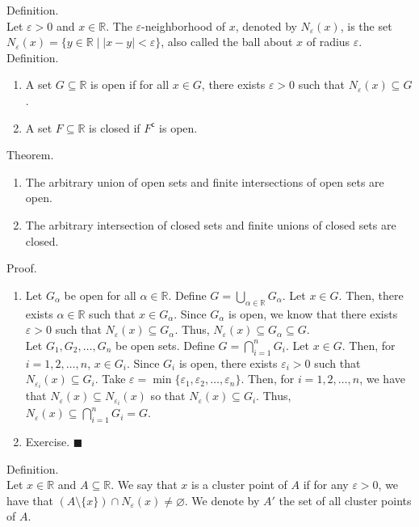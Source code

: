 \documentclass[twocolumn]{article}
\newcommand{\qed}{$\blacksquare$}
\newcommand{\br}{\vspace{\baselineskip}}
\newcommand{\COMPLEMENT}{^\mathsf{c}}
\let\complement\COMPLEMENT
\let\emptyset\varnothing
\let\eps\varepsilon
\newcommand{\reals}{\mathbb{R}}
\begin{document}
Definition. \\
Let $\eps > 0$ and $x \in \reals$. The $\eps$-neighborhood of $x$, denoted by $N_\eps(x)$, is the set $N_\eps(x) = \{ y \in \reals \mid |x - y| < \eps \}$, also called the ball about $x$ of radius $\eps$. \\

Definition.
\begin{enumerate}
	\item
		A set $G \subseteq \reals$ is open if for all $x \in G$, there exists $\eps > 0$ such that $N_\eps(x) \subseteq G$.
	\item
		A set $F \subseteq \reals$ is closed if $F\complement$ is open.
\end{enumerate} \br

Theorem.
\begin{enumerate}
	\item
		The arbitrary union of open sets and finite intersections of open sets are open.
	\item
		The arbitrary intersection of closed sets and finite unions of closed sets are closed.
\end{enumerate}
Proof.
\begin{enumerate}
	\item
		Let $G_\alpha$ be open for all $\alpha \in \reals$. Define $G = \bigcup_{\alpha \in \reals} G_\alpha$. Let $x \in G$. Then, there exists $\alpha \in \reals$ such that $x \in G_\alpha$. Since $G_\alpha$ is open, we know that there exists $\eps > 0$ such that $N_\eps(x) \subseteq G_\alpha$. Thus, $N_\eps(x) \subseteq G_\alpha \subseteq G$. \\
		Let $G_1, G_2, \ldots, G_n$ be open sets.  Define $G = \bigcap_{i = 1}^n G_i$. Let $x \in G$. Then, for $i = 1, 2, \ldots, n$, $x \in G_i$. Since $G_i$ is open, there exists $\eps_i > 0$ such that $N_{\eps_i}(x) \subseteq G_i$. Take $\eps = \min \{ \eps_1, \eps_2, \ldots, \eps_n \}$. Then, for $i = 1, 2, \ldots, n$, we have that $N_\eps(x) \subseteq N_{\eps_i}(x)$ so that $N_\eps(x) \subseteq G_i$. Thus, $N_\eps(x) \subseteq \bigcap_{i = 1}^n G_i = G$.
	\item
		Exercise. \qed
\end{enumerate} \br

Definition. \\
Let $x \in \reals$ and $A \subseteq \reals$. We say that $x$ is a cluster point of $A$ if for any $\eps > 0$, we have that $(A \setminus \{ x \}) \cap N_\eps(x) \neq \emptyset$. We denote by $A'$ the set of all cluster points of $A$. \\
\end{document}
